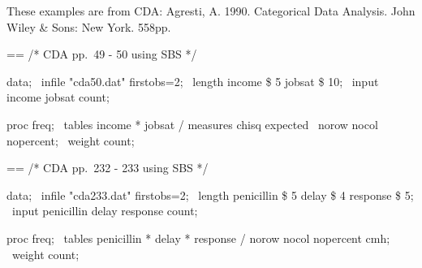 \documentclass{book}
\makeatletter
\newenvironment{Texinfopreformatted}{%
  \par\GNUTobeylines\obeyspaces\frenchspacing\parskip=\z@\parindent=\z@}{}
{\catcode`\^^M=13 \gdef\GNUTobeylines{\catcode`\^^M=13 \def^^M{\null\par}}}
\newenvironment{Texinfoindented}{\begin{list}{}{}\item\relax}{\end{list}}
\renewcommand{\_}{\Texinfounderscore\discretionary{}{}{}}
\makeatother
\begin{document}
These examples are from CDA: Agresti, A.  1990.  Categorical Data Analysis.
John Wiley \& Sons: New York.  558pp.

\begin{Texinfoindented}
\begin{Texinfopreformatted}%
\ttfamily /* CDA pp.\ 49 - 50 using SBS */

data;
\ infile "cda50.dat" firstobs=2;
\ length income \$ 5 jobsat \$ 10;
\ input income jobsat count;

proc freq;
\ tables income * jobsat / measures chisq expected
\                          norow nocol nopercent;
\ weight count;

\end{Texinfopreformatted}
\end{Texinfoindented}

\begin{Texinfoindented}
\begin{Texinfopreformatted}%
\ttfamily /* CDA pp.\ 232 - 233 using SBS */

data;
\ infile "cda233.dat" firstobs=2;
\ length penicillin \$ 5 delay \$ 4 response \$ 5;
\ input penicillin delay response count;

proc freq;
\ tables penicillin * delay * response / norow nocol nopercent cmh;
\ weight count;


\end{Texinfopreformatted}
\end{Texinfoindented}
\end{document}
